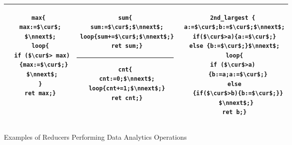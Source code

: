 \begin{figure}
	\centering
	\lstset{language=C,
		basicstyle=\ttfamily\scriptsize}
	\begin{tabular}{|c|c|c|}
		\hline
		\begin{minipage}[t]{0.23\textwidth}
		\vspace{-0.5cm}
			\begin{lstlisting}[mathescape=true]
max{
 max:=$\cur$;
 $\nnext$;
 loop{
  if ($\cur$> max)
   {max:=$\cur$;}
  $\nnext$;
 }
 ret max;}
	\end{lstlisting}
		\end{minipage}&
		\begin{minipage}[t]{0.27\textwidth}
		\vspace{-0.5cm}
			\begin{lstlisting}[mathescape=true]
sum{
 sum:=$\cur$;$\nnext$;
 loop{sum+=$\cur$;$\nnext$;}
 ret sum;}
			\end{lstlisting}
\hrule\vspace{0.1cm}%
			\begin{lstlisting}[mathescape=true]
cnt{
 cnt:=0;$\nnext$;
 loop{cnt+=1;$\nnext$;}
 ret cnt;}
			\end{lstlisting}			
		\end{minipage}&
		\begin{minipage}[t]{0.30\textwidth}
		\vspace{-0.5cm}			
			\begin{lstlisting}[mathescape=true]
2nd_largest {
 a:=$\cur$;b:=$\cur$;$\nnext$;
 if($\cur$>a){a:=$\cur$;}
 else {b:=$\cur$;}$\nnext$;
 loop{
  if ($\cur$>a)  
   {b:=a;a:=$\cur$;}
  else 
   {if($\cur$>b){b:=$\cur$;}}
  $\nnext$;}
 ret b;}
			\end{lstlisting}		
		\end{minipage}\\
		\hline		
	\end{tabular}
	\caption{Examples of Reducers Performing Data Analytics Operations}
	\label{fig:examples}
\end{figure}
\vspace{-0.5cm}
